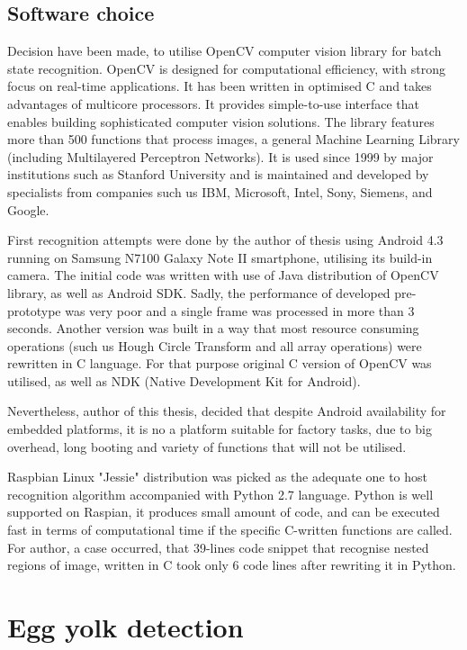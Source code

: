 \documentclass[12pt,twoside,a4paper]{article}
\begin{document}
\newpage

\subsection{Software choice}
Decision have been made, to utilise OpenCV computer vision library for batch state recognition.
OpenCV is designed for computational efficiency, with strong focus on real-time applications.
It has been written in optimised C and takes advantages of multicore processors.
It provides simple-to-use interface that enables building sophisticated computer vision solutions.
The library features more than 500 functions that process images, a general Machine Learning Library (including Multilayered Perceptron Networks).
It is used since 1999 by major institutions such as Stanford University and is maintained and developed by specialists from companies such us IBM, Microsoft, Intel, Sony, Siemens, and Google.\cite{learnopencv}

First recognition attempts were done by the author of thesis using Android 4.3 running on Samsung N7100 Galaxy Note II smartphone, utilising its build-in camera.
The initial code was written with use of Java distribution of OpenCV library, as well as Android SDK.
Sadly, the performance of developed pre-prototype was very poor and a single frame was processed in more than 3 seconds.
Another version was built in a way that most resource consuming operations (such us Hough Circle Transform and all array operations) were rewritten in C language.
For that purpose original C version of OpenCV was utilised, as well as NDK (Native Development Kit for Android).

Nevertheless, author of this thesis, decided that despite Android availability for embedded platforms, it is no a platform suitable for factory tasks, due to big overhead, long booting and variety of functions that will not be utilised.

Raspbian Linux "Jessie" distribution was picked as the adequate one to host recognition algorithm accompanied with Python 2.7 language.
Python is well supported on Raspian, it produces small amount of code, and can be executed fast in terms of computational time if the specific C-written functions are called.\cite{performance}
For author, a case occurred, that 39-lines code snippet that recognise nested regions of image, written in C took only 6 code lines after rewriting it in Python.


\section{Egg yolk detection}
\end{document}
